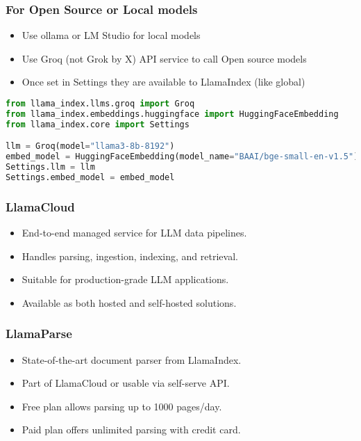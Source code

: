 \begin{frame}[fragile]\frametitle{For Open Source or Local models}
\begin{itemize}
  \item Use ollama or LM Studio for local models
  \item Use Groq (not Grok by X) API service to call Open source models
  \item Once set in Settings they are available to LlamaIndex (like global)
\end{itemize}

\begin{lstlisting}[language=Python]
from llama_index.llms.groq import Groq
from llama_index.embeddings.huggingface import HuggingFaceEmbedding
from llama_index.core import Settings

llm = Groq(model="llama3-8b-8192")
embed_model = HuggingFaceEmbedding(model_name="BAAI/bge-small-en-v1.5")
Settings.llm = llm
Settings.embed_model = embed_model
\end{lstlisting}
\end{frame}


\begin{frame}[fragile]\frametitle{LlamaCloud}
\begin{itemize}
  \item End-to-end managed service for LLM data pipelines.
  \item Handles parsing, ingestion, indexing, and retrieval.
  \item Suitable for production-grade LLM applications.
  \item Available as both hosted and self-hosted solutions.
\end{itemize}
\end{frame}

\begin{frame}[fragile]\frametitle{LlamaParse}
\begin{itemize}
  \item State-of-the-art document parser from LlamaIndex.
  \item Part of LlamaCloud or usable via self-serve API.
  \item Free plan allows parsing up to 1000 pages/day.
  \item Paid plan offers unlimited parsing with credit card.
\end{itemize}
\end{frame}


